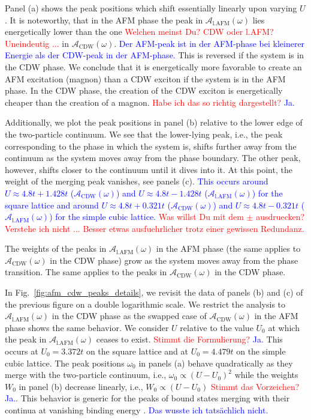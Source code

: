 \documentclass[
    reprint, 
    aps,
    preprintnumbers,
    twocolumn,
    prb,
    superscriptaddress
]{revtex4-2}
\newcommand{\spectral}[1]{\mathcal{A}_\text{#1}  (\omega)}
\newcommand{\red}[1]{\textcolor{red}{#1}}
\newcommand{\blue}[1]{\textcolor{blue}{#1}}
\begin{document}
Panel (a) shows the peak positions which shift essentially linearly upon varying $U$.
It is noteworthy, that in the AFM phase the peak in $\spectral{l.AFM}$ lies energetically
lower than the one \red{Welchen meinst Du? CDW oder l.AFM? Uneindeutig ...} in $\spectral{CDW}$. \blue{Der AFM-peak ist in der AFM-phase bei kleinerer Energie als der CDW-peak in der AFM-phase.}
This is reversed if the system is in the CDW phase.
We conclude that it is energetically more favorable to create an AFM excitation (magnon) than a CDW
exciton if the system is in the AFM phase. In the CDW phase, the creation of the CDW exciton is
energetically cheaper than the creation of a magnon. \red{Habe ich das so richtig dargestellt?} \blue{Ja.}

Additionally, we plot the peak positions in panel (b) relative to the lower edge of the two-particle continuum.
We see that the lower-lying peak, i.e., the peak corresponding to the phase in which the system is, 
shifts further away from the continuum as the system moves away from the phase boundary.
The other peak, however, shifts closer to the continuum until it dives into it.
At this point, the weight of the merging peak vanishes, see panels (c).
\blue{This occurs around $U \approx 4.8t + 1.428t$ ($\spectral{CDW}$) and $U \approx 4.8t - 1.428t$ ($\spectral{l.AFM}$) for the square lattice 
and around $U \approx 4.8t + 0.321t$  ($\spectral{CDW}$) and $U \approx 4.8t - 0.321t$  ($\spectral{l.AFM}$) for the simple cubic lattice.}
\red{Was willst Du mit dem $\pm$ ausdruecken? Verstehe ich nicht ... Besser etwas ausfuehrlicher trotz
einer gewissen Redundanz.}

The weights of the peaks in $\spectral{l.AFM}$ in the AFM phase (the same applies to $\spectral{CDW}$ in the CDW phase) grow as the system moves away from the phase transition.
The same applies to the peaks in $\spectral{CDW}$ in the CDW phase.

In Fig.\ \ref{fig:afm_cdw_peaks_details}, we revisit the data of panels (b) and (c) of the previous figure
on a double logarithmic scale.
We restrict the analysis to $\spectral{l.AFM}$ in the CDW phase as the swapped case of $\spectral{CDW}$ in the 
AFM phase shows the same behavior.
We consider $U$ relative to the value $U_0$ at which the peak in $\spectral{l.AFM}$ ceases to exist.
\red{Stimmt die Formulierung?} \blue{Ja.}
This occurs at $U_0 = 3.372t$ on the square lattice and at $U_0 = 4.479t$ on the simple cubic lattice.
The peak positions $\omega_0$ in panels (a) behave quadratically as they merge with the 
two-particle continuum, i.e., 
$\omega_0 \propto (U-U_0)^2$ while the weights $W_0$ in panel (b) decrease linearly, i.e., 
$W_0 \propto (U-U_0)$ \red{Stimmt das Vorzeichen?} \blue{Ja.}. This behavior is generic for the peaks of bound states merging with
their continua at vanishing binding energy \cite{uhrig96b,uhrig96be,zhito13}. \blue{Das wusste ich tatsächlich nicht.}
\end{document}
